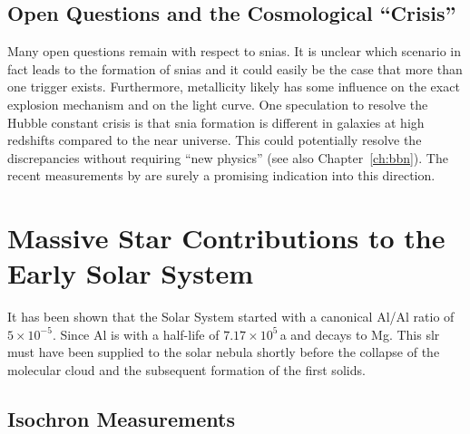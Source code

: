 \subsection{Open Questions and the Cosmological ``Crisis''}

Many open questions remain with respect to \acp{snia}. It is unclear which scenario in fact leads to the formation of \acp{snia} and it could easily be the case that more than one trigger exists. Furthermore, metallicity likely has some influence on the exact explosion mechanism and on the light curve. One speculation to resolve the Hubble constant crisis is that \ac{snia} formation is different in galaxies at high redshifts compared to the near universe. This could potentially resolve the discrepancies without requiring ``new physics'' (see also Chapter~\ref{ch:bbn}). The recent measurements by \citet{freedman19} are surely a promising indication into this direction.



\section{Massive Star Contributions to the Early Solar System}

It has been shown \citep{jacobsen08} that the Solar System started with a canonical Al/Al ratio of $5\times10^{-5}$. Since Al is  with a half-life of $7.17\times10^{5}$\,a and decays to Mg. This \ac{slr} must have been supplied to the solar nebula shortly before the collapse of the molecular cloud and the subsequent formation of the first solids. 

\subsection{Isochron Measurements}

